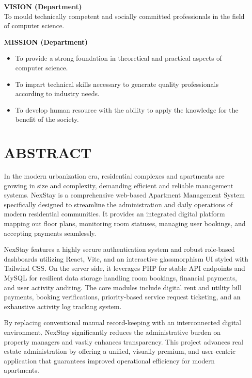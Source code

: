 \documentclass[12pt,a4paper]{report}
\begin{document}
\vspace{1cm}
\textbf{VISION (Department)}\\
To mould technically competent and socially committed professionals in the field of computer science.

\vspace{0.5cm}
\textbf{MISSION (Department)}\\
\begin{itemize}
    \item To provide a strong foundation in theoretical and practical aspects of computer science.
    \item To impart technical skills necessary to generate quality professionals according to industry needs.
    \item To develop human resource with the ability to apply the knowledge for the benefit of the society.
\end{itemize}

\clearpage

\chapter*{ABSTRACT}
In the modern urbanization era, residential complexes and apartments are growing in size and complexity, demanding efficient and reliable management systems. NexStay is a comprehensive web-based Apartment Management System specifically designed to streamline the administration and daily operations of modern residential communities. It provides an integrated digital platform mapping out floor plans, monitoring room statuses, managing user bookings, and accepting payments seamlessly.

NexStay features a highly secure authentication system and robust role-based dashboards utilizing React, Vite, and an interactive glassmorphism UI styled with Tailwind CSS. On the server side, it leverages PHP for stable API endpoints and MySQL for resilient data storage handling room bookings, financial payments, and user activity auditing. The core modules include digital rent and utility bill payments, booking verifications, priority-based service request ticketing, and an exhaustive activity log tracking system. 

By replacing conventional manual record-keeping with an interconnected digital environment, NexStay significantly reduces the administrative burden on property managers and vastly enhances transparency. This project advances real estate administration by offering a unified, visually premium, and user-centric application that guarantees improved operational efficiency for modern apartments.
\end{document}
